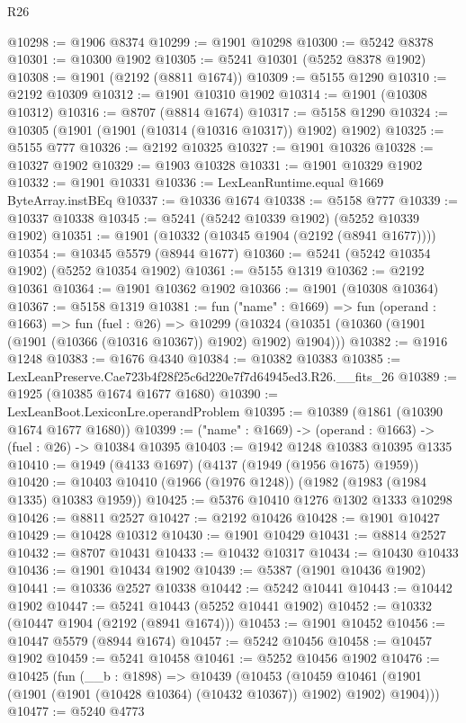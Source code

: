 \begin{lexlean}{R26}
\begin{coremodule}
@10298 := @1906 @8374
@10299 := @1901 @10298
@10300 := @5242 @8378
@10301 := @10300 @1902
@10305 := @5241 @10301 (@5252 @8378 @1902)
@10308 := @1901 (@2192 (@8811 @1674))
@10309 := @5155 @1290
@10310 := @2192 @10309
@10312 := @1901 @10310 @1902
@10314 := @1901 (@10308 @10312)
@10316 := @8707 (@8814 @1674)
@10317 := @5158 @1290
@10324 := @10305 (@1901 (@1901 (@10314 (@10316 @10317)) @1902) @1902)
@10325 := @5155 @777
@10326 := @2192 @10325
@10327 := @1901 @10326
@10328 := @10327 @1902
@10329 := @1903 @10328
@10331 := @1901 @10329 @1902
@10332 := @1901 @10331
@10336 := LexLeanRuntime.equal @1669 ByteArray.instBEq
@10337 := @10336 @1674
@10338 := @5158 @777
@10339 := @10337 @10338
@10345 := @5241 (@5242 @10339 @1902) (@5252 @10339 @1902)
@10351 := @1901 (@10332 (@10345 @1904 (@2192 (@8941 @1677))))
@10354 := @10345 @5579 (@8944 @1677)
@10360 := @5241 (@5242 @10354 @1902) (@5252 @10354 @1902)
@10361 := @5155 @1319
@10362 := @2192 @10361
@10364 := @1901 @10362 @1902
@10366 := @1901 (@10308 @10364)
@10367 := @5158 @1319
@10381 := fun ("name" : @1669) =>
  fun (operand : @1663) =>
  fun (fuel : @26) =>
  @10299 (@10324 (@10351 (@10360 (@1901 (@1901 (@10366 (@10316 @10367)) @1902) @1902) @1904)))
@10382 := @1916 @1248
@10383 := @1676 @4340
@10384 := @10382 @10383
@10385 := LexLeanPreserve.Cae723b4f28f25c6d220e7f7d64945ed3.R26.__fits_26
@10389 := @1925 (@10385 @1674 @1677 @1680)
@10390 := LexLeanBoot.LexiconLre.operandProblem
@10395 := @10389 (@1861 (@10390 @1674 @1677 @1680))
@10399 := ("name" : @1669) -> (operand : @1663) -> (fuel : @26) -> @10384 @10395
@10403 := @1942 @1248 @10383 @10395 @1335
@10410 := @1949 (@4133 @1697) (@4137 (@1949 (@1956 @1675) @1959))
@10420 := @10403 @10410 (@1966 (@1976 @1248)) (@1982 (@1983 (@1984 @1335) @10383 @1959))
@10425 := @5376 @10410 @1276 @1302 @1333 @10298
@10426 := @8811 @2527
@10427 := @2192 @10426
@10428 := @1901 @10427
@10429 := @10428 @10312
@10430 := @1901 @10429
@10431 := @8814 @2527
@10432 := @8707 @10431
@10433 := @10432 @10317
@10434 := @10430 @10433
@10436 := @1901 @10434 @1902
@10439 := @5387 (@1901 @10436 @1902)
@10441 := @10336 @2527 @10338
@10442 := @5242 @10441
@10443 := @10442 @1902
@10447 := @5241 @10443 (@5252 @10441 @1902)
@10452 := @10332 (@10447 @1904 (@2192 (@8941 @1674)))
@10453 := @1901 @10452
@10456 := @10447 @5579 (@8944 @1674)
@10457 := @5242 @10456
@10458 := @10457 @1902
@10459 := @5241 @10458
@10461 := @5252 @10456 @1902
@10476 := @10425
    (fun (__b : @1898) =>
    @10439
      (@10453
        (@10459 @10461 (@1901 (@1901 (@1901 (@10428 @10364) (@10432 @10367)) @1902) @1902) @1904)))
@10477 := @5240 @4773

\end{coremodule}
\end{lexlean}
